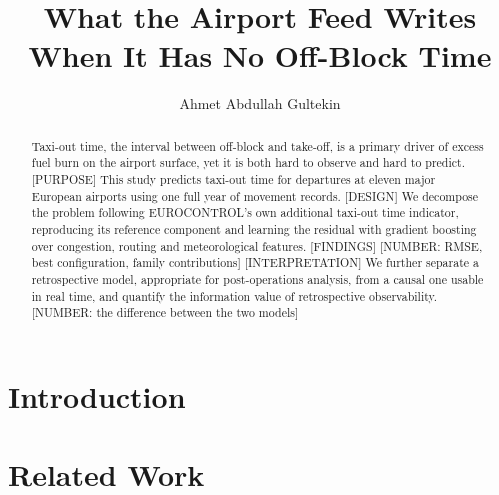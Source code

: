\documentclass[
  manuscript=article,
  layout=preprint,
  year=2026,
  volume=x,
]{extra/joas}
\title{What the Airport Feed Writes When It Has No Off-Block Time}
\author{Ahmet Abdullah Gultekin \orcid{0000-0000-0000-0000}}
\affiliation{Institution, City, Turkiye}
\begin{document}
\begin{abstract}
  Taxi-out time, the interval between off-block and take-off, is a primary driver of
  excess fuel burn on the airport surface, yet it is both hard to observe and hard to
  predict. [PURPOSE] This study predicts taxi-out time for departures at eleven major
  European airports using one full year of movement records. [DESIGN] We decompose the
  problem following EUROCONTROL's own additional taxi-out time indicator, reproducing its
  reference component and learning the residual with gradient boosting over congestion,
  routing and meteorological features. [FINDINGS] [NUMBER: RMSE, best configuration,
  family contributions] [INTERPRETATION] We further separate a retrospective model,
  appropriate for post-operations analysis, from a causal one usable in real time, and
  quantify the information value of retrospective observability. [NUMBER: the difference
  between the two models]
\end{abstract}


\section{Introduction}


\section{Related Work}
\end{document}
